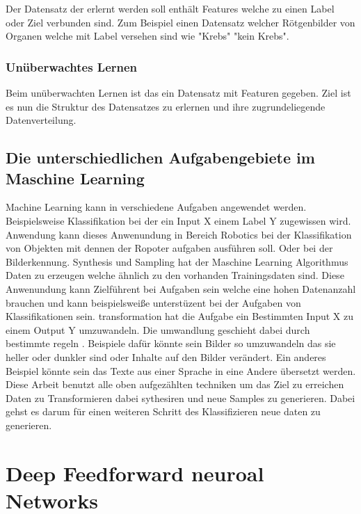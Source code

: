 \documentclass{llncs}
\begin{document}
Der Datensatz der erlernt werden soll enthält Features welche zu einen Label oder Ziel verbunden sind. Zum Beispiel einen Datensatz welcher Rötgenbilder von Organen welche mit Label versehen sind wie "Krebs" "kein Krebs". 

\subsubsection{Unüberwachtes Lernen}

Beim unüberwachten Lernen ist das ein Datensatz mit Featuren gegeben. Ziel ist es nun die Struktur des Datensatzes zu erlernen und ihre zugrundeliegende Datenverteilung. 
\\

\subsection{Die unterschiedlichen Aufgabengebiete im Maschine Learning}

Machine Learning kann in verschiedene Aufgaben angewendet werden. Beispielsweise Klassifikation bei der ein Input X einem Label Y zugewissen wird. Anwendung kann dieses Anwenundung in Bereich Robotics bei der Klassifikation von Objekten mit dennen der Ropoter aufgaben ausführen soll. Oder bei der Bilderkennung. Synthesis und Sampling hat der Maschine Learning Algorithmus Daten zu erzeugen welche ähnlich zu den vorhanden Trainingsdaten sind. Diese Anwenundung kann Zielführent bei Aufgaben sein welche eine hohen Datenanzahl brauchen und kann beispielsweiße unterstüzent bei der Aufgaben von Klassifikationen sein. transformation hat die Aufgabe ein Bestimmten Input X zu einem Output Y umzuwandeln. Die umwandlung geschieht dabei durch bestimmte regeln \cite{dcgan}. Beispiele dafür könnte sein Bilder so umzuwandeln das sie heller oder dunkler sind oder Inhalte auf den Bilder verändert. Ein anderes Beispiel könnte sein das Texte aus einer Sprache in eine Andere übersetzt werden. 
\\
Diese Arbeit benutzt alle oben aufgezählten techniken um das Ziel zu erreichen Daten zu Transformieren dabei sythesiren und neue Samples zu generieren. Dabei gehst es darum für einen weiteren Schritt des Klassifizieren neue daten zu generieren. 



\section{Deep Feedforward neuroal Networks}
\end{document}
